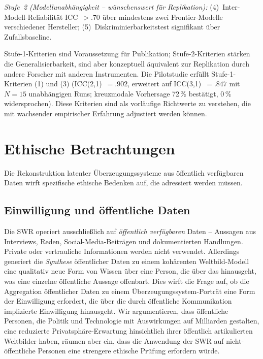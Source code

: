 \documentclass[11pt,a4paper]{article}
\theoremstyle{definition}
\theoremstyle{plain}
\theoremstyle{remark}
\begin{document}
\emph{Stufe~2 (Modellunabh\"angigkeit -- w\"unschenswert f\"ur Replikation):} (4)~Inter-Modell-Reliabilit\"at ICC~$> .70$ \"uber mindestens zwei Frontier-Modelle verschiedener Hersteller; (5)~Diskriminierbarkeitstest signifikant \"uber Zufallsbaseline.

Stufe-1-Kriterien sind Voraussetzung f\"ur Publikation; Stufe-2-Kriterien st\"arken die Generalisierbarkeit, sind aber konzeptuell \"aquivalent zur Replikation durch andere Forscher mit anderen Instrumenten. Die Pilotstudie \citep{Geiger2026Elite} erf\"ullt Stufe-1-Kriterien (1) und (3) (ICC(2,1)~$= .902$, erweitert auf ICC(3,1)~$= .847$ mit $N = 15$ unabh\"angigen Runs; kreuzmodale Vorhersage 72\,\% best\"atigt, 0\,\% widersprochen). Diese Kriterien sind als vorl\"aufige Richtwerte zu verstehen, die mit wachsender empirischer Erfahrung adjustiert werden k\"onnen.



\section{Ethische Betrachtungen}
\label{sec:ethik}

Die Rekonstruktion latenter \"Uberzeugungssysteme aus \"offentlich verf\"ugbaren Daten wirft spezifische ethische Bedenken auf, die adressiert werden m\"ussen.

\subsection{Einwilligung und \"offentliche Daten}

Die SWR operiert ausschlie\ss{}lich auf \emph{\"offentlich verf\"ugbaren} Daten -- Aussagen aus Interviews, Reden, Social-Media-Beitr\"agen und dokumentierten Handlungen. Private oder vertrauliche Informationen werden nicht verwendet. Allerdings generiert die \emph{Synthese} \"offentlicher Daten zu einem koh\"arenten Weltbild-Modell eine qualitativ neue Form von Wissen \"uber eine Person, die \"uber das hinausgeht, was eine einzelne \"offentliche Aussage offenbart. Dies wirft die Frage auf, ob die Aggregation \"offentlicher Daten zu einem \"Uberzeugungssystem-Portr\"at eine Form der Einwilligung erfordert, die \"uber die durch \"offentliche Kommunikation implizierte Einwilligung hinausgeht. Wir argumentieren, dass \"offentliche Personen, die Politik und Technologie mit Auswirkungen auf Milliarden gestalten, eine reduzierte Privatsph\"are-Erwartung hinsichtlich ihrer \"offentlich artikulierten Weltbilder haben, r\"aumen aber ein, dass die Anwendung der SWR auf nicht-\"offentliche Personen eine strengere ethische Pr\"ufung erfordern w\"urde.
\end{document}
